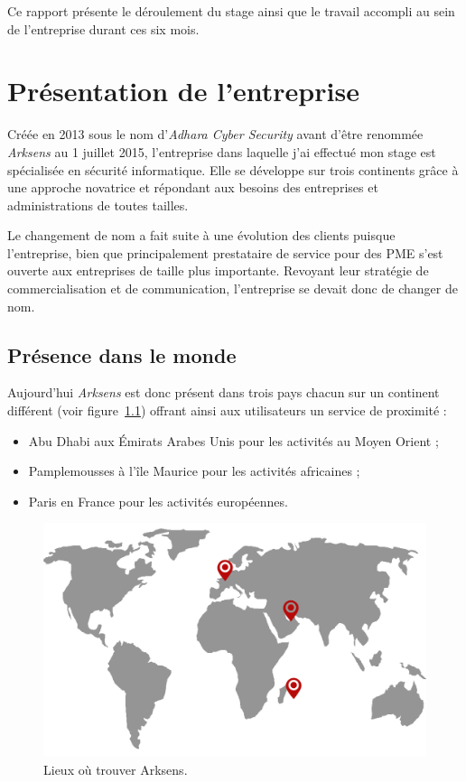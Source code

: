 \documentclass[a4paper,10pt, twoside]{report}
\begin{document}
\begin{spacing}{1.2}
Ce rapport présente le déroulement du stage ainsi que le travail accompli
au sein de l'entreprise durant ces six mois.

\chapter{Présentation de l'entreprise}
\thispagestyle{fancy}
Créée en 2013 sous le nom d'\textit{Adhara Cyber Security} avant
d'être renommée \textit{Arksens} au 1 juillet 2015, l'entreprise 
dans laquelle j'ai effectué mon stage est spécialisée en sécurité
informatique. Elle se développe sur trois continents grâce à une
approche novatrice et répondant aux besoins des entreprises et
administrations de toutes tailles.

Le changement de nom a fait suite à une évolution des clients puisque
l'entreprise, bien que principalement prestataire de service pour des PME
s'est ouverte aux entreprises de taille plus importante. Revoyant leur
stratégie de commercialisation et de communication, l'entreprise se devait
donc de changer de nom.

\section{Présence dans le monde}

Aujourd'hui \textit{Arksens} est donc présent dans trois pays chacun sur
un continent différent (voir figure~\ref{mapArksens}) offrant ainsi aux
utilisateurs un service de proximité :
\begin{itemize}
  \item Abu Dhabi aux Émirats Arabes Unis pour les activités au Moyen
  Orient ;
  \item Pamplemousses à l’île Maurice pour les activités africaines ;
  \item Paris en France pour les activités européennes.
\end{itemize}

\begin{figure}[h!]
  \centering
  \includegraphics[scale=0.30]{map_arksens.png}
  \caption{\label{mapArksens} Lieux où trouver Arksens.}
\end{figure}
      

\end{spacing}
\end{document}
